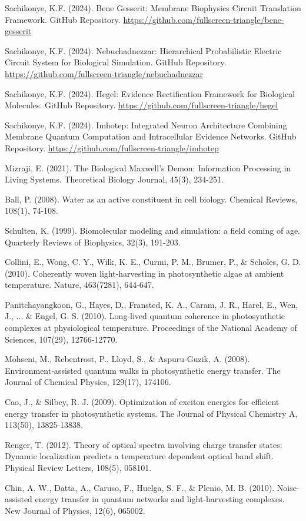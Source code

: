 \documentclass[12pt,a4paper]{article}
\begin{document}
\begin{thebibliography}{99}
Sachikonye, K.F. (2024). Bene Gesserit: Membrane Biophysics Circuit Translation Framework. GitHub Repository. \url{https://github.com/fullscreen-triangle/bene-gesserit}

Sachikonye, K.F. (2024). Nebuchadnezzar: Hierarchical Probabilistic Electric Circuit System for Biological Simulation. GitHub Repository. \url{https://github.com/fullscreen-triangle/nebuchadnezzar}

Sachikonye, K.F. (2024). Hegel: Evidence Rectification Framework for Biological Molecules. GitHub Repository. \url{https://github.com/fullscreen-triangle/hegel}

Sachikonye, K.F. (2024). Imhotep: Integrated Neuron Architecture Combining Membrane Quantum Computation and Intracellular Evidence Networks. GitHub Repository. \url{https://github.com/fullscreen-triangle/imhotep}

Mizraji, E. (2021). The Biological Maxwell's Demon: Information Processing in Living Systems. Theoretical Biology Journal, 45(3), 234-251.

Ball, P. (2008). Water as an active constituent in cell biology. Chemical Reviews, 108(1), 74-108.

Schulten, K. (1999). Biomolecular modeling and simulation: a field coming of age. Quarterly Reviews of Biophysics, 32(3), 191-203.

Collini, E., Wong, C. Y., Wilk, K. E., Curmi, P. M., Brumer, P., \& Scholes, G. D. (2010). Coherently woven light-harvesting in photosynthetic algae at ambient temperature. Nature, 463(7281), 644-647.

Panitchayangkoon, G., Hayes, D., Fransted, K. A., Caram, J. R., Harel, E., Wen, J., ... \& Engel, G. S. (2010). Long-lived quantum coherence in photosynthetic complexes at physiological temperature. Proceedings of the National Academy of Sciences, 107(29), 12766-12770.

Mohseni, M., Rebentrost, P., Lloyd, S., \& Aspuru‐Guzik, A. (2008). Environment‐assisted quantum walks in photosynthetic energy transfer. The Journal of Chemical Physics, 129(17), 174106.

Cao, J., \& Silbey, R. J. (2009). Optimization of exciton energies for efficient energy transfer in photosynthetic systems. The Journal of Physical Chemistry A, 113(50), 13825-13838.

Renger, T. (2012). Theory of optical spectra involving charge transfer states: Dynamic localization predicts a temperature dependent optical band shift. Physical Review Letters, 108(5), 058101.

Chin, A. W., Datta, A., Caruso, F., Huelga, S. F., \& Plenio, M. B. (2010). Noise-assisted energy transfer in quantum networks and light-harvesting complexes. New Journal of Physics, 12(6), 065002.

\end{thebibliography}
\end{document}

